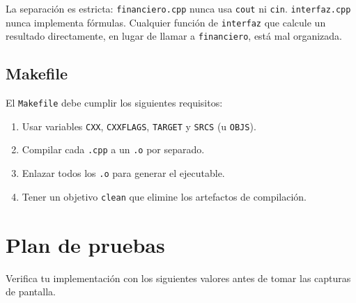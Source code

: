 \documentclass[12pt, oneside]{article}
\begin{document}
\begin{recuerda}
  La separación es estricta: \texttt{financiero.cpp} nunca usa
  \texttt{cout} ni \texttt{cin}.  \texttt{interfaz.cpp} nunca implementa
  fórmulas.  Cualquier función de \texttt{interfaz} que calcule un resultado
  directamente, en lugar de llamar a \texttt{financiero}, está mal organizada.
\end{recuerda}

\subsection{Makefile}

El \texttt{Makefile} debe cumplir los siguientes requisitos:

\begin{enumerate}
  \item Usar variables \texttt{CXX}, \texttt{CXXFLAGS},
        \texttt{TARGET} y \texttt{SRCS} (u \texttt{OBJS}).
  \item Compilar cada \texttt{.cpp} a un \texttt{.o} por separado.
  \item Enlazar todos los \texttt{.o} para generar el ejecutable.
  \item Tener un objetivo \texttt{clean} que elimine los artefactos
        de compilación.
\end{enumerate}

\section{Plan de pruebas}

Verifica tu implementación con los siguientes valores antes de tomar las
capturas de pantalla.
\end{document}
